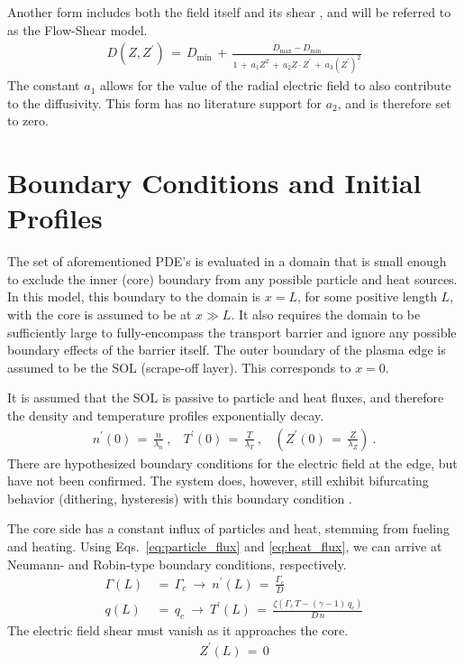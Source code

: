 Another form includes both the field itself and its shear \cite{paquay_studying_2012}, and will be referred to as the Flow-Shear model.
\begin{align} %
	D(Z, Z^{\prime}) \,=\, D_\text{min} \,+\,
		\frac{D_\text{max} - D_\text{min}}{1 \,+\, a_1 Z^2 \,+\,
		a_2 Z \cdot Z^{\prime} \,+\, a_3 (Z^{\prime})^2}
		\label{eq:flow_shear_diffusivity}
\end{align}
The constant $a_1$ allows for the value of the radial electric field to also contribute to the diffusivity.
This form has no literature support for $a_2$, and is therefore set to zero.

\section{Boundary Conditions and Initial Profiles}\label{sec:boundary_conditions}
The set of aforementioned PDE's is evaluated in a domain that is small enough to exclude the inner (core) boundary from any possible particle and heat sources.
In this model, this boundary to the domain is $x = L$, for some positive length $L$, with the core is assumed to be at $x \gg L$.
It also requires the domain to be sufficiently large to fully-encompass the transport barrier and ignore any possible boundary effects of the barrier itself.
The outer boundary of the plasma edge is assumed to be the SOL (scrape-off layer).
This corresponds to $x = 0$.

It is assumed that the SOL is passive to particle and heat fluxes, and therefore the density and temperature profiles exponentially decay.
\begin{align} %
	n^\prime(0) \,=\, \frac{n}{\lambda_n}~, ~~~~
		T^\prime(0) \,=\, \frac{T}{\lambda_T}~, ~~~~
		\left(Z^\prime(0) \,=\, \frac{Z}{\lambda_Z}\right)~. \label{eq:SOL_boundary}
\end{align}
There are hypothesized boundary conditions for the electric field at the edge, but have not been confirmed.
The system does, however, still exhibit bifurcating behavior (dithering, hysteresis) with this boundary condition \cite{paquay_studying_2012}.

The core side has a constant influx of particles and heat, stemming from fueling and heating.
Using Eqs.~\ref{eq:particle_flux} and \ref{eq:heat_flux}, we can arrive at Neumann- and Robin-type boundary conditions, respectively.
\begin{align} %
	\Gamma(L) \,&=\, \Gamma_c ~\longrightarrow~ n^\prime(L)
		\,=\, \frac{\Gamma_c}{D} \label{eq:core_particle_flux}\\
	q(L) \,&=\, q_c ~\longrightarrow~ T^\prime(L) \,=\, \frac{\zeta(
		\Gamma_c \, T - (\gamma - 1)\,q_c)}{D \, n} \label{eq:core_heat_flux}
\end{align}
The electric field shear must vanish as it approaches the core.
\begin{align} %
	Z^\prime(L) \,=\, 0 \label{eq:core_Z_boundary}
\end{align}


